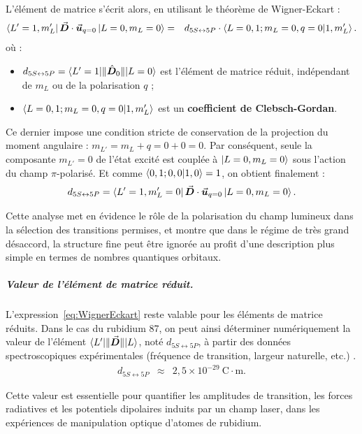 L’élément de matrice s’écrit alors, en utilisant le théorème de Wigner-Eckart :
\begin{eqnarray}
\bra{L' = 1, m_L'} \vec{{\bm{D}}} \cdot \vec{{\bm{u}}}_{q=0} \ket{L = 0, m_L = 0}
& = & d_{\scriptstyle 5S \leftrightarrow 5P} \cdot \braket{L=0, 1; m_L = 0, q=0 | 1, m_L' }.
\end{eqnarray}
où :
\begin{itemize}[label = $\bullet$]
	\item $d_{\scriptstyle 5S \leftrightarrow 5P} = \braket{L' = 1 \vert \Vert \hat{\bm{D}}_0 \Vert \vert L =0 }$  est l’élément de matrice réduit,  indépendant de $m_L$ ou de la polarisation $q$ ;
	\item $\braket{L=0, 1; m_L = 0, q=0 | 1, m_L' }$ est un \textbf{coefficient de Clebsch-Gordan}.
\end{itemize}
Ce dernier impose une condition stricte de conservation de la projection du moment angulaire : $m_{L'} = m_L + q = 0 + 0  = 0 $. Par conséquent, seule la composante $m_{L'} = 0 $  de l’état excité est couplée à $\ket{L = 0 , m_L = 0}$ sous l’action du champ $\pi$-polarisé. Et comme $\braket{0,1;0,0|1,0}=1$, on obtient finalement :
\begin{eqnarray}
 d_{\scriptstyle 5S \leftrightarrow 5P} = \bra{L' = 1, m_L'=0} \vec{{\bm{D}}} \cdot \vec{{\bm{u}}}_{q=0} \ket{L = 0, m_L = 0} .
\end{eqnarray}

Cette analyse met en évidence le rôle de la polarisation du champ lumineux dans la sélection des transitions permises, et montre que dans le régime de très grand désaccord, la structure fine peut être ignorée au profit d’une description plus simple en termes de nombres quantiques orbitaux.


\subparagraph{Valeur de l’élément de matrice réduit.}

L'expression~\eqref{eq:WignerEckart} reste valable pour les éléments de matrice réduits. %
Dans le cas du rubidium 87, on peut ainsi déterminer numériquement la valeur de l’élément $\bra{L'}\!\|\vec{{\bm{D}}}\|\!\ket{L}$, noté $d_{\scriptstyle 5S \leftrightarrow 5P}$, à partir des données spectroscopiques expérimentales (fréquence de transition, largeur naturelle, etc.) \cite{Steck2002}.
\begin{eqnarray}
d_{\scriptstyle 5S \leftrightarrow 5P} &\approx& 2{,}5 \times 10^{-29}~\mathrm{C \cdot m}.
\end{eqnarray}

Cette valeur est essentielle pour quantifier les amplitudes de transition, les forces radiatives et les potentiels dipolaires induits par un champ laser, dans les expériences de manipulation optique d’atomes de rubidium.



